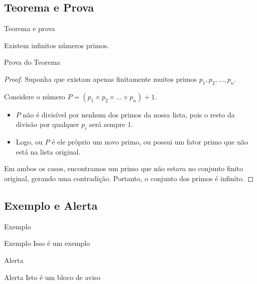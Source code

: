 \documentclass[aspectratio=169]{beamer}
\begin{document}
\subsection{Teorema e Prova}

\begin{frame}{Teorema e prova}

\begin{theorem}
    Existem infinitos números primos.
  \end{theorem}

\end{frame}

\begin{frame}{Prova do Teorema}

  \begin{proof}
    Suponha que existam apenas finitamente muitos primos $p_1, p_2, \dots, p_n$. 
    
    Considere o número $P = (p_1 \times p_2 \times \dots \times p_n) + 1$.
    
    \begin{itemize}
        \item $P$ não é divisível por nenhum dos primos da nossa lista, pois o resto da divisão por qualquer $p_i$ será sempre $1$.
        \item Logo, ou $P$ é ele próprio um novo primo, ou possui um fator primo que não está na lista original.
    \end{itemize}
    
    Em ambos os casos, encontramos um primo que não estava no conjunto finito original, gerando uma contradição. Portanto, o conjunto dos primos é infinito.
  \end{proof}

\end{frame}

\subsection{Exemplo e Alerta}

\begin{frame}{Exemplo}

\begin{exampleblock}{Exemplo}
    Isso é um exemplo
\end{exampleblock}
    
\end{frame}

\begin{frame}{Alerta}

\begin{alertblock}{Alerta}
    Isto é um bloco de aviso
\end{alertblock}
    
\end{frame}
\end{document}
